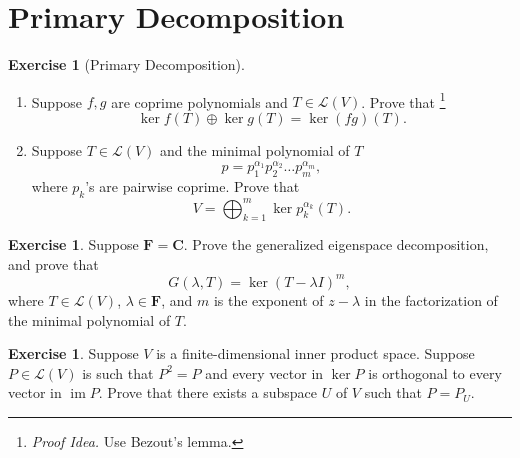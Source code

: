 \documentclass[nofonts,colorlinks]{tufte-handout}
\theoremstyle{plain} %
\theoremstyle{definition}
\newtheorem{exer}[thm]{Exercise}
\theoremstyle{remark}
\def\idea{\textit{\color[rgb]{0,0,.55}Proof Idea. }}
\newcommand{\C}{\mathbf{C}}
\newcommand{\F}{\mathbf{F}}
\renewcommand{\L}{\mathcal{L}}
\DeclareMathOperator{\im}{im}
\begin{document}
\section{Primary Decomposition}
\begin{exer}[Primary Decomposition]
	\begin{enumerate}
		\item Suppose $f,g$ are coprime polynomials and $T\in\L(V)$. Prove that%
		\footnote{\idea Use Bezout's lemma.}
		\[\ker f(T)\oplus\ker g(T)=\ker(fg)(T).\]
		\item Suppose $T\in\L(V)$ and the minimal polynomial of $T$
		\[p=p_1^{\alpha_1}p_2^{\alpha_2}\dots p_m^{\alpha_m},\]
		where $p_k$'s are pairwise coprime. Prove that
		\[V=\bigoplus_{k=1}^m\ker p_k^{\alpha_k}(T).\]
	\end{enumerate}
\end{exer}

\begin{exer}
	Suppose $\F=\C$. Prove the generalized eigenspace decomposition, and prove that
	\[G(\lambda,T)=\ker(T-\lambda I)^m,\]
	where $T\in\L(V)$, $\lambda\in\F$, and $m$ is the exponent of $z-\lambda$ in the factorization of the minimal polynomial of $T$.
\end{exer}

\begin{exer}
	Suppose $V$ is a finite-dimensional inner product space. Suppose $P\in\L(V)$ is such that $P^2=P$ and every vector in $\ker P$ is orthogonal to every vector in $\im P$. Prove that there exists a subspace $U$ of $V$ such that $P=P_U$.
\end{exer}
\end{document}
